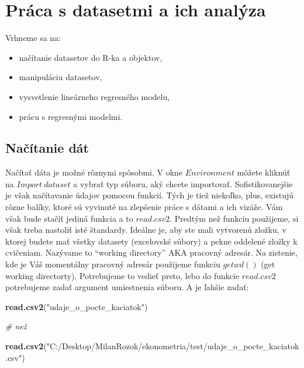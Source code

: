 \documentclass[]{article}
\newenvironment{Shaded}{\begin{snugshade}}{\end{snugshade}}
\newcommand{\CommentTok}[1]{\textcolor[rgb]{0.56,0.35,0.01}{\textit{#1}}}
\newcommand{\KeywordTok}[1]{\textcolor[rgb]{0.13,0.29,0.53}{\textbf{#1}}}
\newcommand{\NormalTok}[1]{#1}
\newcommand{\StringTok}[1]{\textcolor[rgb]{0.31,0.60,0.02}{#1}}
\providecommand{\tightlist}{%
  \setlength{\itemsep}{0pt}\setlength{\parskip}{0pt}}
\begin{document}
\hypertarget{pruxe1ca-s-datasetmi-a-ich-analuxfdza}{%
\section{Práca s datasetmi a ich
analýza}\label{pruxe1ca-s-datasetmi-a-ich-analuxfdza}}

Vrhneme sa na:

\begin{itemize}
\tightlist
\item
  načítanie datasetov do R-ka a objektov,
\item
  manipuláciu datasetov,
\item
  vysvetlenie lineárneho regresného modelu,
\item
  prácu s regresnými modelmi.
\end{itemize}

\hypertarget{naux10duxedtanie-duxe1t}{%
\subsection{Načítanie dát}\label{naux10duxedtanie-duxe1t}}

Načítať dáta je možné rôznymi spôsobmi. V okne \(Environment\) môžete
kliknúť na \(Import \ dataset\) a vybrať typ súboru, aký chcete
importovať. Sofistikovanejšie je však načítavanie údajov pomocou
funkcií. Tých je tiež niekoľko, plus, existujú rôzne balíky, ktoré sú
vyvinuté na zlepšenie práce s dátami a ich vizáže. Vám však bude stačíť
jediná funkcia a to \(read.csv2\). Predtým než funkciu použijeme, si
však treba nastoliť isté štandardy. Ideálne je, aby ste mali vytvorenú
zložku, v ktorej budete mať všetky datasety (excelovské súbory) a pekne
oddelené zložky k cvičeniam. Nazývame to ``working directory'' AKA
pracovný adresár. Na zistenie, kde je Váš momentálny pracovný adresár
použijeme funkciu \(getwd()\) (get working directorty). Potrebujeme to
vedieť preto, lebo do funkcie \(read.csv2\) potrebujeme zadať argument
umiestnenia súboru. A je ľahšie zadať:

\begin{Shaded}
\begin{Highlighting}[]
\KeywordTok{read.csv2}\NormalTok{(}\StringTok{"udaje_o_pocte_kaciatok"}\NormalTok{)}

\CommentTok{# než}

\KeywordTok{read.csv2}\NormalTok{(}\StringTok{"C:/Desktop/MilanRozok/ekonometria/test/udaje_o_pocte_kaciatok.csv"}\NormalTok{)}
\end{Highlighting}
\end{Shaded}
\end{document}

